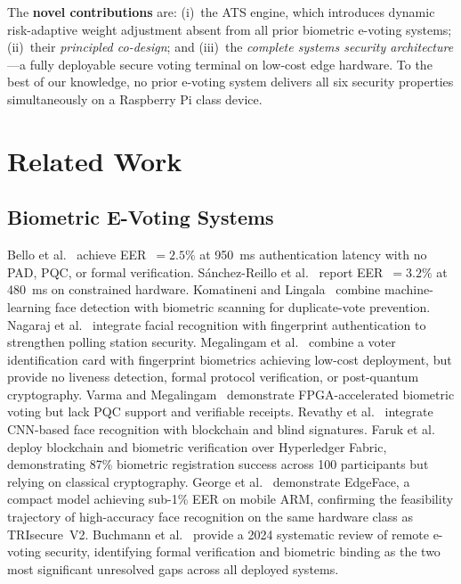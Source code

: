 \documentclass[submission]{sacjsub}
\begin{document}
The \textbf{novel contributions} are: (i)~the ATS engine, which
introduces dynamic risk-adaptive weight adjustment absent from all prior
biometric e-voting systems; (ii)~their \emph{principled co-design}; and
(iii)~the \emph{complete systems security architecture}---a fully
deployable secure voting terminal on low-cost edge hardware. To the best
of our knowledge, no prior e-voting system delivers all six security
properties simultaneously on a Raspberry Pi class device.

\section{Related Work}\label{sec:related}

\subsection{Biometric E-Voting Systems}

Bello et al.~\cite{bello2021biometric} achieve EER~\(=2.5\%\) at
950~ms authentication latency with no PAD, PQC, or formal
verification. S\'{a}nchez-Reillo et al.~\cite{sanchez2020biometric}
report EER~\(=3.2\%\) at 480~ms on constrained hardware. Komatineni
and Lingala~\cite{komatineni2020biometric} combine machine-learning
face detection with biometric scanning for duplicate-vote prevention.
Nagaraj et al.~\cite{nagaraj2022voting} integrate facial recognition
with fingerprint authentication to strengthen polling station security.
Megalingam et al.~\cite{megalingam2022voter} combine a voter
identification card with fingerprint biometrics achieving low-cost
deployment, but provide no liveness detection, formal protocol
verification, or post-quantum cryptography. Varma and
Megalingam~\cite{varma2025fpga} demonstrate FPGA-accelerated biometric
voting but lack PQC support and verifiable receipts. Revathy et
al.~\cite{revathy2022cnn_evoting} integrate CNN-based face recognition
with blockchain and blind signatures. Faruk et
al.~\cite{faruk2024transforming} deploy blockchain and biometric
verification over Hyperledger Fabric, demonstrating 87\% biometric
registration success across 100 participants but relying on classical
cryptography. George et al.~\cite{george2024adaptive_biometric}
demonstrate EdgeFace, a compact model achieving sub-1\% EER on mobile
ARM, confirming the feasibility trajectory of high-accuracy face
recognition on the same hardware class as TRIsecure~V2. Buchmann et
al.~\cite{buchmann2024pvoting} provide a 2024 systematic review of
remote e-voting security, identifying formal verification and biometric
binding as the two most significant unresolved gaps across all deployed
systems.
\end{document}
